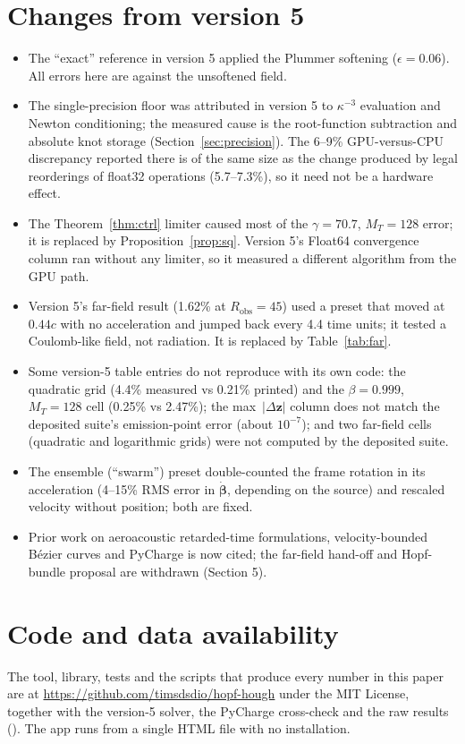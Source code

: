 \documentclass[11pt, a4paper]{article}
\begin{document}
\section{Changes from version 5}\label{sec:changes}
\begin{itemize}
    \item The ``exact'' reference in version 5 applied the Plummer softening ($\epsilon = 0.06$). All errors here are against the unsoftened field.
    \item The single-precision floor was attributed in version 5 to $\kappa^{-3}$ evaluation and Newton conditioning; the measured cause is the root-function subtraction and absolute knot storage (Section~\ref{sec:precision}). The 6--9\% GPU-versus-CPU discrepancy reported there is of the same size as the change produced by legal reorderings of float32 operations (5.7--7.3\%), so it need not be a hardware effect.
    \item The Theorem~\ref{thm:ctrl} limiter caused most of the $\gamma = 70.7$, $M_T = 128$ error; it is replaced by Proposition~\ref{prop:sq}. Version 5's Float64 convergence column ran without any limiter, so it measured a different algorithm from the GPU path.
    \item Version 5's far-field result (1.62\% at $R_{\text{obs}} = 45$) used a preset that moved at $0.44c$ with no acceleration and jumped back every 4.4 time units; it tested a Coulomb-like field, not radiation. It is replaced by Table~\ref{tab:far}.
    \item Some version-5 table entries do not reproduce with its own code: the quadratic grid (4.4\% measured vs 0.21\% printed) and the $\beta = 0.999$, $M_T = 128$ cell (0.25\% vs 2.47\%); the max~$|\Delta\mathbf{z}|$ column does not match the deposited suite's emission-point error (about $10^{-7}$); and two far-field cells (quadratic and logarithmic grids) were not computed by the deposited suite.
    \item The ensemble (``swarm'') preset double-counted the frame rotation in its acceleration (4--15\% RMS error in $\dot{\boldsymbol{\beta}}$, depending on the source) and rescaled velocity without position; both are fixed.
    \item Prior work on aeroacoustic retarded-time formulations, velocity-bounded B\'ezier curves and PyCharge is now cited; the far-field hand-off and Hopf-bundle proposal are withdrawn (Section 5).
\end{itemize}

\section{Code and data availability}
The tool, library, tests and the scripts that produce every number in this paper are at \url{https://github.com/timsdsdio/hopf-hough} under the MIT License, together with the version-5 solver, the PyCharge cross-check and the raw results (). The app runs from a single HTML file with no installation.
\end{document}
